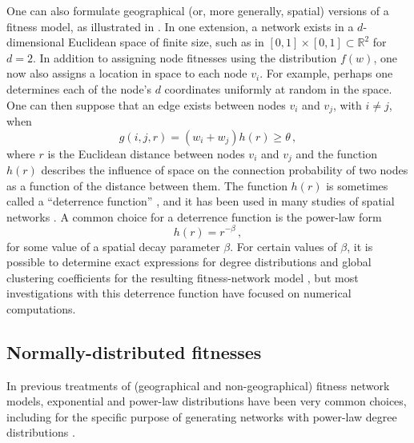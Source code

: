 \documentclass[%
 reprint,
 amsmath,amssymb,
 aps,
]{revtex4-1}
\begin{document}
One can also formulate geographical (or, more generally, spatial) versions of a fitness model, as illustrated in \cite{geographical_threshold, boguna, caldarelli}. In one extension, a network exists in a $d$-dimensional Euclidean space of finite size, such as in $[0, 1] \times [0, 1] \subset \mathbb{R}^2$ for $d = 2$. In addition to assigning node fitnesses using the distribution $f(w)$, one now also assigns a location in space to each node $v_i$. For example, perhaps one determines each of the node's $d$ coordinates uniformly at random in the space. One can then suppose that an edge exists between nodes $v_i$ and $v_j$, with $i \neq j$, when
\begin{equation}
    g(i, j, r) = (w_i + w_j)h(r) \geq \theta \,,
\end{equation}
where $r$ is the Euclidean distance between nodes $v_i$ and $v_j$ and the function $h(r)$ describes the influence of space on the connection probability of two nodes as a function of the distance between them. The function $h(r)$ is sometimes called a ``deterrence function'' \cite{barbosa}, and it has been used in many studies of spatial networks \cite{barthelemy}. A common choice for a deterrence function is the power-law form \cite{geographical_threshold}
\begin{equation}\label{distance_equation}
    h(r) = r^{-\beta}\,,
\end{equation}
for some value of a spatial decay parameter $\beta$. For certain values of $\beta$, it is possible to determine exact expressions for degree distributions and global clustering coefficients for the resulting fitness-network model \cite{geographical_threshold}, but most investigations with this deterrence function have focused on numerical computations. 



\subsection{Normally-distributed fitnesses}

In previous treatments of (geographical and non-geographical) fitness network models, exponential and power-law distributions have been very common choices, including for the specific purpose of generating networks with power-law degree distributions \cite{geographical_threshold, geographical_threshold2, caldarelli, boguna}.
\end{document}

